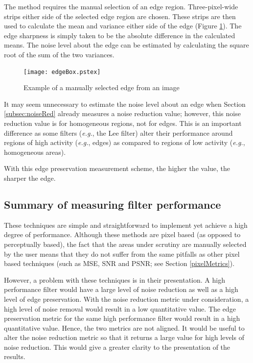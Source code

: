 \documentclass[12pt]{report}
\begin{document}
The method requires the manual selection of an edge region.
Three-pixel-wide strips either side of the selected edge region are 
chosen. These strips are then used to calculate the mean and variance
either side of the edge (Figure \ref{fig:edgeBox}).
The edge sharpness is simply taken to be the absolute difference in the
calculated means. The noise level about the edge can 
be estimated by calculating the square root of the sum of the two variances.

\begin{figure}[htb]
	\begin{center}
		\texttt{[image: edgeBox.pstex]}
		\caption{Example of a manually selected edge from an image}
		\label{fig:edgeBox}
	\end{center}
\end{figure}

It may seem unnecessary to estimate the noise level about an edge when 
Section \ref{subsec:noiseRed} already measures a noise reduction value;
however, this noise reduction value is for homogeneous regions, not for edges.
This is an important difference as some filters (\emph{e.g.}, the Lee filter) 
alter their performance
around regions of high activity (\emph{e.g.}, edges) as compared to regions of low activity
(\emph{e.g.}, homogeneous areas).

With this edge preservation measurement scheme, the higher the value, the sharper the
edge. 

\subsection{Summary of measuring filter performance}
These techniques are simple and straightforward to implement yet achieve 
a high degree of performance.
Although these methods are pixel based (as opposed to perceptually based), 
the fact that the areas under scrutiny 
are manually selected by the user means that they do not suffer from the same 
pitfalls as other pixel based techniques (such as MSE, SNR and PSNR; see Section \ref{pixelMetrics}).

However, a problem with these techniques is in their presentation. A high performance filter 
would have a large level of noise reduction as well as a high level of edge preservation.
With the noise reduction metric under consideration, a high level of noise removal would result in a low 
quantitative value. The edge preservation metric for the same high performance filter would result in
a high quantitative value. Hence, the two metrics are not aligned. It would be useful to alter the
noise reduction metric so that it returns a large value 
for high levels of noise reduction. 
This would give a greater clarity to the presentation of the results.
\end{document}
